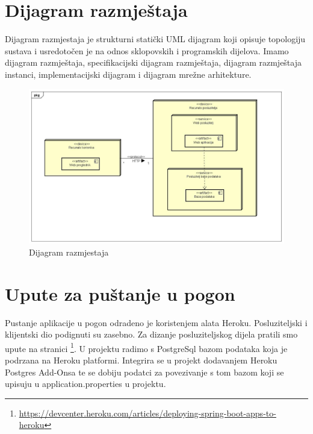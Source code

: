 			\eject 
		
		
		\section{Dijagram razmještaja}
		
		Dijagram razmjestaja je strukturni statički UML dijagram koji opisuje topologiju sustava i usredotočen je na odnos sklopovskih i programskih dijelova.
		Imamo dijagram razmještaja, specifikacijski dijagram razmještaja, dijagram razmještaja instanci, implementacijski dijagram i dijagram mrežne arhitekture.
			
			\begin{figure}[H]
				
				\includegraphics[width=\textwidth]{slike/Deployment Diagram0.jpg} %
				\centering
				\caption{Dijagram razmjestaja}
				\label{fig:dijagramraz}
			\end{figure}
			\eject 
		
		\section{Upute za puštanje u pogon}
		
		Pustanje aplikacije u pogon odradeno je koristenjem alata Heroku. Posluziteljski i klijentski dio podignuti su zasebno. Za dizanje posluziteljskog dijela pratili smo upute na stranici \footnote{\url{ https://devcenter.heroku.com/articles/deploying-spring-boot-apps-to-heroku}}.
		U projektu radimo s PostgreSql bazom podataka koja je podrzana na Heroku platformi. Integrira se u projekt dodavanjem Heroku Postgres Add-Onsa te se dobiju podatci za povezivanje s tom bazom koji se upisuju u application.properties u projektu.
		
